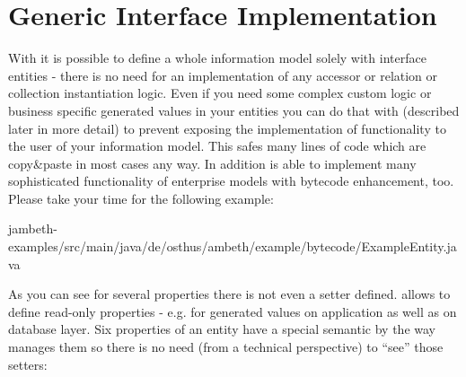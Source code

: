 \section{Generic Interface Implementation}
\label{feature:InterfaceImpl}
\ClearAPI
With \AMBETH{} it is possible to define a whole information model solely with interface entities - there is no need for an implementation of any accessor or relation or collection instantiation logic. Even if you need some complex custom logic or business specific generated values in your entities you can do that with  (described later in more detail) to prevent exposing the implementation of functionality to the user of your information model. This safes many lines of code which are copy\&paste in most cases any way. In addition \AMBETH{} is able to implement many sophisticated functionality of enterprise models with bytecode enhancement, too. Please take your time for the following example:

	{jambeth-examples/src/main/java/de/osthus/ambeth/example/bytecode/ExampleEntity.java}

As you can see for several properties there is not even a setter defined. \AMBETH{} allows to define read-only properties - e.g. for generated values on application as well as on database layer. Six properties of an entity have a special semantic by the way \AMBETH{} manages them so there is no need (from a technical perspective) to ``see'' those setters:

